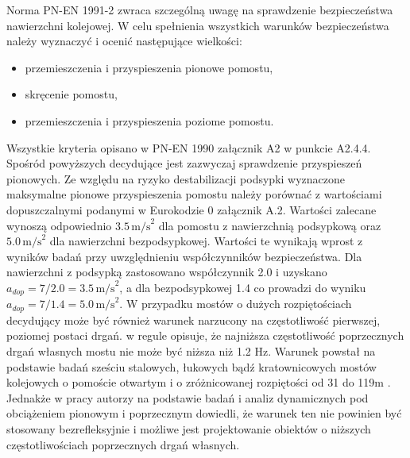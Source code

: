 Norma PN-EN 1991-2 zwraca szczególną uwagę na sprawdzenie bezpieczeństwa nawierzchni kolejowej. W celu spełnienia wszystkich warunków bezpieczeństwa należy wyznaczyć i ocenić następujące wielkości:
\begin{itemize}
	\item przemieszczenia i przyspieszenia pionowe pomostu,
	\item skręcenie pomostu,
	\item przemieszczenia i przyspieszenia poziome pomostu.
\end{itemize}
Wszystkie kryteria opisano w PN-EN 1990 załącznik A2 w punkcie A2.4.4. Spośród powyższych decydujące jest zazwyczaj sprawdzenie przyspieszeń pionowych. Ze względu na ryzyko destabilizacji podsypki wyznaczone maksymalne pionowe przyspieszenia pomostu należy porównać z wartościami dopuszczalnymi podanymi w Eurokodzie 0 załącznik A.2. Wartości zalecane wynoszą odpowiednio $3.5\,\text{m/s}^2$ dla pomostu z nawierzchnią podsypkową oraz $5.0 \,\text{m/s}^2$ dla nawierzchni bezpodsypkowej. Wartości te wynikają wprost z wyników badań \parencite{Zacher2008} przy uwzględnieniu współczynników bezpieczeństwa. Dla nawierzchni z podsypką zastosowano współczynnik 2.0 i uzyskano $a_{dop}=7/2.0=3.5\,\text{m/s}^2$, a dla bezpodsypkowej 1.4 co prowadzi do wyniku $a_{dop}=7/1.4=5.0\,\text{m/s}^2$.
W przypadku mostów o dużych rozpiętościach decydujący może być również warunek narzucony na częstotliwość pierwszej, poziomej postaci drgań. \cite{PKNc} w regule opisuje, że najniższa częstotliwość poprzecznych drgań własnych mostu nie może być niższa niż 1.2 Hz. Warunek powstał na podstawie badań sześciu stalowych, łukowych bądź kratownicowych mostów kolejowych o pomoście otwartym i o zróżnicowanej rozpiętości od 31 do 119m \parencite{ERRI1996}. Jednakże w pracy \cite{Dias2008} autorzy na podstawie badań i analiz dynamicznych pod obciążeniem pionowym i poprzecznym dowiedli, że warunek ten nie powinien być stosowany bezrefleksyjnie i możliwe jest projektowanie obiektów o niższych częstotliwościach poprzecznych drgań własnych.

